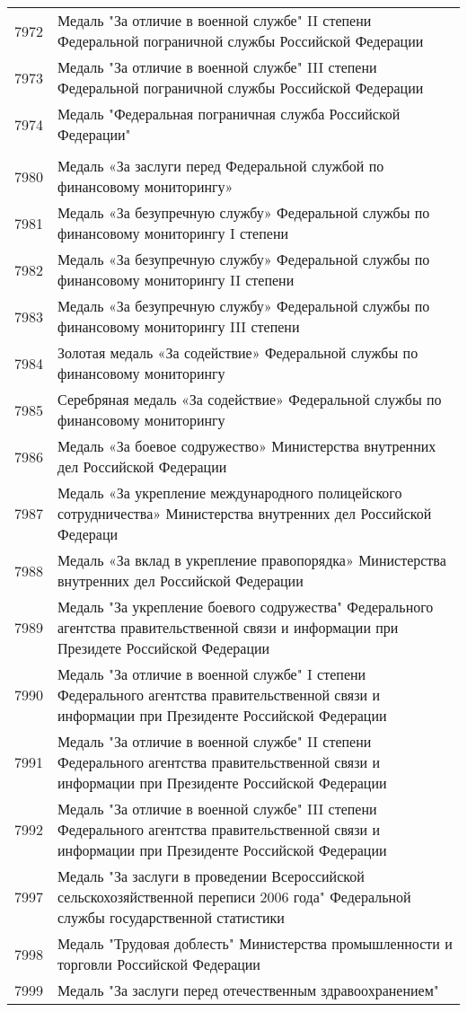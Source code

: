 \documentclass[10pt, a4paper, titlepage]{article}
\begin{document}
\begin{center}
\begin{longtable}{rp{}}
        7972 & Медаль "За отличие в военной службе" II степени Федеральной пограничной службы Российской Федерации \\
        7973 & Медаль "За отличие в военной службе" III степени Федеральной пограничной службы Российской Федерации \\
        7974 & Медаль "Федеральная пограничная служба Российской Федерации" \\ \\
        7980 & Медаль «За заслуги перед Федеральной службой по финансовому мониторингу» \\
        7981 & Медаль «За безупречную службу» Федеральной службы по финансовому мониторингу I степени \\
        7982 & Медаль «За безупречную службу» Федеральной службы по финансовому мониторингу II степени \\
        7983 & Медаль «За безупречную службу» Федеральной службы по финансовому мониторингу III степени \\
        7984 & Золотая медаль «За содействие» Федеральной службы по финансовому мониторингу \\
        7985 & Серебряная медаль «За содействие» Федеральной службы по финансовому мониторингу \\
        7986 & Медаль «За боевое содружество» Министерства внутренних дел Российской Федерации \\
        7987 & Медаль «За укрепление международного полицейского сотрудничества» Министерства внутренних дел Российской Федераци \\
        7988 & Медаль «За вклад в укрепление правопорядка» Министерства внутренних дел Российской Федерации \\
        7989 & Медаль "За укрепление боевого содружества" Федерального агентства правительственной связи и информации при Президете Российской Федерации \\
        7990 & Медаль "За отличие в военной службе" I степени Федерального агентства правительственной связи и информации при Президенте Российской Федерации \\
        7991 & Медаль "За отличие в военной службе" II степени Федерального агентства правительственной связи и информации при Президенте Российской Федерации \\
        7992 & Медаль "За отличие в военной службе" III степени Федерального агентства правительственной связи и информации при Президенте Российской Федерации \\
        7997 & Медаль "За заслуги в проведении Всероссийской сельскохозяйственной переписи 2006 года" Федеральной службы государственной статистики \\
        7998 & Медаль "Трудовая доблесть" Министерства промышленности и торговли Российской Федерации \\
        7999 & Медаль "За заслуги перед отечественным здравоохранением" \\
    \end{longtable}
\end{center}
\end{document}

